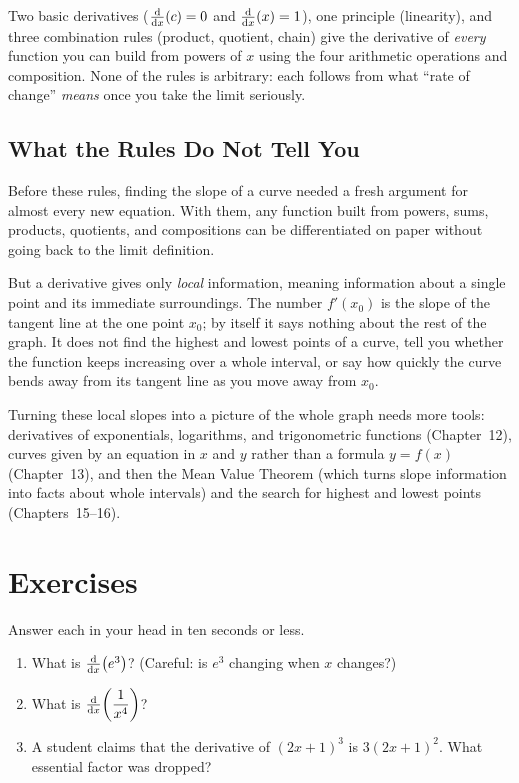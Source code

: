 \begin{aestheticbox}
Two basic derivatives ($\frac{\mathrm{d}}{\mathrm{d} x}\!\left(c\right)=0$ and $\frac{\mathrm{d}}{\mathrm{d} x}\!\left(x\right)=1$), one principle (linearity), and
three combination rules (product, quotient, chain) give the derivative of \emph{every}
function you can build from powers of $x$ using the four arithmetic operations and
composition. None of the rules is arbitrary: each follows from what ``rate of change''
\emph{means} once you take the limit seriously.
\end{aestheticbox}

\subsection{What the Rules Do Not Tell You}
\label{ch11:what-unlocked}

\begin{connectionbox}
Before these rules, finding the slope of a curve needed a fresh argument for almost every new equation. With them, any function built from powers, sums, products, quotients, and compositions can be differentiated on paper without going back to the limit definition.

But a derivative gives only \emph{local} information, meaning information about a single point and its immediate surroundings. The number $f'(x_0)$ is the slope of the tangent line at the one point $x_0$; by itself it says nothing about the rest of the graph. It does not find the highest and lowest points of a curve, tell you whether the function keeps increasing over a whole interval, or say how quickly the curve bends away from its tangent line as you move away from $x_0$.

Turning these local slopes into a picture of the whole graph needs more tools:
derivatives of exponentials, logarithms, and trigonometric functions (Chapter~12),
curves given by an equation in $x$ and $y$ rather than a formula $y=f(x)$
(Chapter~13), and then the Mean Value Theorem (which turns slope information into facts
about whole intervals) and the search for highest and lowest points (Chapters~15--16).
\end{connectionbox}

\section{Exercises}
\label{ch11:exercises}

\begin{exercise}
Answer each in your head in ten seconds or less.
\begin{enumerate}
  \item What is $\frac{\mathrm{d}}{\mathrm{d} x}\!\left(e^3\right)$? (Careful: is $e^3$ changing when $x$ changes?)
  \item What is $\frac{\mathrm{d}}{\mathrm{d} x}\!\left(\dfrac{1}{x^4}\right)$?
  \item A student claims that the derivative of $(2x+1)^3$ is $3(2x+1)^2$. What essential factor was dropped?
\end{enumerate}
\end{exercise}

